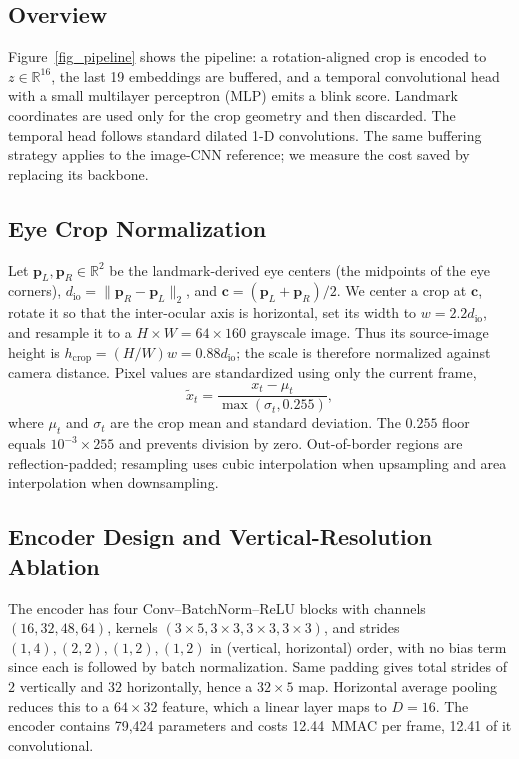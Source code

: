 \documentclass{IEEEmce}
\begin{document}
\subsection{Overview}
Figure~\ref{fig_pipeline} shows the pipeline: a rotation-aligned crop is encoded to
$z\in\mathbb{R}^{16}$, the last 19 embeddings are buffered, and a temporal convolutional
head with a small multilayer perceptron (MLP) emits a blink score. Landmark coordinates
are used only for the crop geometry and then discarded. The temporal head follows
standard dilated 1-D convolutions. The same buffering strategy applies to the image-CNN
reference; we measure the cost saved by replacing its backbone.

\subsection{Eye Crop Normalization}
Let $\bm p_L,\bm p_R\in\mathbb R^2$ be the landmark-derived eye centers (the midpoints
of the eye corners), $d_{\mathrm{io}}=\lVert\bm p_R-\bm p_L\rVert_2$, and $\bm c=(\bm
p_L+\bm p_R)/2$. We center a crop at $\bm c$, rotate it so that the inter-ocular axis is
horizontal, set its width to $w=2.2d_{\mathrm{io}}$, and resample it to a $H\times
W=64\times160$ grayscale image. Thus its source-image height is
$h_{\mathrm{crop}}=(H/W)w=0.88d_{\mathrm{io}}$; the scale is therefore normalized
against camera distance. Pixel values are standardized using only the current frame,
\begin{equation}
\tilde{x}_t=\frac{x_t-\mu_t}{\max(\sigma_t,0.255)},
\label{eq:normalization}
\end{equation}
where $\mu_t$ and $\sigma_t$ are the crop mean and standard deviation. The $0.255$ floor
equals $10^{-3}\times255$ and prevents division by zero. Out-of-border regions are
reflection-padded; resampling uses cubic interpolation when upsampling and area
interpolation when downsampling.

\subsection{Encoder Design and Vertical-Resolution Ablation}
\label{sec_encoder}
The encoder has four
Conv--BatchNorm--ReLU blocks with channels $(16,32,48,64)$, kernels
$(3\times5,3\times3,3\times3,3\times3)$, and strides $(1,4),(2,2),(1,2),(1,2)$ in
(vertical, horizontal) order, with no bias term since each is followed by batch
normalization. Same padding gives total strides of $2$ vertically and $32$ horizontally,
hence a $32\times5$ map. Horizontal average pooling reduces this to a $64\times32$
feature, which a linear layer maps to $D=16$. The encoder contains 79,424 parameters and
costs 12.44~MMAC per frame, 12.41 of it convolutional.
\end{document}
